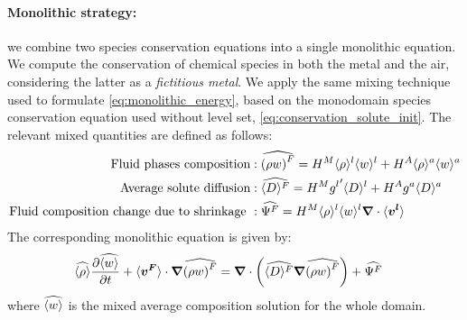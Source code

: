 \paragraph{Monolithic strategy:}
we combine two species conservation equations into a single monolithic equation. 
We compute the conservation of chemical species in both the metal and the air, considering the latter as
a \emph{fictitious metal}. We apply the same mixing technique used to formulate
\cref{eq:monolithic_energy}, based on the monodomain species conservation equation
used without level set, \cref{eq:conservation_solute_init}. The relevant mixed quantities
are defined as follows:
\begin{align}
%
\label{eq:monolithic_fluid_composition}
\text{Fluid phases composition}&: \mix{\brac{\rho w}^F} = \heavisideM \rhol \wl + \heavisideA \rhoa \wa \\
%
\label{eq:monolithic_solute_diffusion}
\text{Average solute diffusion}&: \mix{\avg{D}^F} = \heavisideM \gl '\avg{D}^l + \heavisideA \ga \avg{D}^a \\
%
\label{eq:monolithic_solute_dissipation}
\text{Fluid composition change due to shrinkage }&: \mix{\Psi^F} = \heavisideM \rhol \wl \nabvec \cdot \vit
%
\end{align}
The corresponding monolithic equation is given by:
\begin{align}
\label{eq:monolithic_solute}
\begin{split}
 & \widehat{\langle \rho \rangle} \frac{\partial \widehat{\langle w \rangle}}{\partial t}   + \langle \boldsymbol{v^F} \rangle \cdot \boldsymbol{\nabla} \widehat{\left( \rho w \right)^F}
    = \boldsymbol{\nabla}  \cdot \left( \widehat{\langle D \rangle^F} \boldsymbol{\nabla} \widehat{\left( \rho w \right)^F}  \right) + \widehat{\Psi^F} 
  \end{split}
\end{align}
where $\widehat{\langle w \rangle}$ is the mixed average composition solution for the whole domain.  


